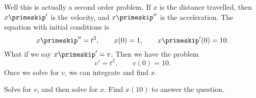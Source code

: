 {
Well this is actually a second order problem.  If $x$ is the distance
travelled, then $x\primeskip'$ is the velocity, and $x\primeskip''$ is the acceleration.
The equation with initial conditions is
\begin{equation*}
x\primeskip'' = t^2 , \qquad x(0) = 1 , \qquad x\primeskip'(0) = 10 .
\end{equation*}
What if we say $x\primeskip' = v$.  Then we have the problem
\begin{equation*}
v' = t^2, \qquad v(0) = 10 .
\end{equation*}
Once we solve for $v$, we can integrate and find $x$.
}\\

\medskip

 Solve for $v$, and then solve for $x$.  Find $x(10)$ to answer the
question.

\medskip


